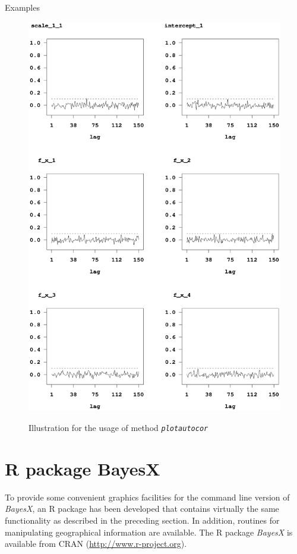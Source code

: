 \begin{stanza}{Examples}
\begin{figure}[ht]
\begin{center}
\includegraphics[scale=0.8]{grafiken/autocorexample1.ps}
{\em\caption{ \label{autocorexample} Illustration for the usage of
method \em\texttt{plotautocor}}}
\end{center}
\end{figure}

\end{stanza}

\clearpage

\section{R package BayesX}\label{rpackage}  

To provide some convenient graphics facilities for the command line version of {\it BayesX}, an R package has been developed
that contains virtually the same functionality as described in the preceding section. In addition, routines for manipulating
geographical information are available. The R package {\it BayesX} is available from CRAN
(\href{http://www.r-project.org}{http://www.r-project.org}).
